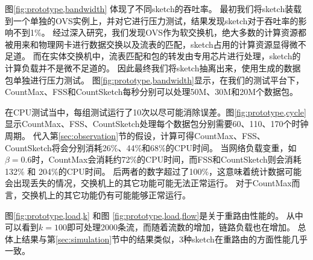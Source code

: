 图\ref{fig:prototype,bandwidth} 体现了不同sketch的吞吐率。
最初我们将sketch装载到一个单独的OVS实例上，并对它进行压力测试，结果发现sketch对于吞吐率的影响不到1\%。
经过深入研究，我们发现OVS作为软交换机，绝大多数的计算资源都被用来和物理网卡进行数据交换以及流表的匹配，sketch占用的计算资源显得微不足道。
而在实体交换机中，流表匹配和包的转发由专用芯片进行处理，sketch的计算负载并不是微不足道的。
因此最终我们将sketch抽离出来，使用生成的数据包单独进行压力测试。
图\ref{fig:prototype,bandwidth}显示，在我们的测试平台下，CountMax、FSS和CountSketch每秒分别可以处理50M、30M和20M个数据包。

在CPU测试当中，每组测试运行了10次以尽可能消除误差。图\ref{fig:prototype,cycle}显示CountMax、FSS、CountSketch处理每个数据包分别需要60、110、170个时钟周期。
代入第\ref{sec:observation}节的假设，计算可得CountMax、FSS、CountSketch将会分别消耗26\%、44\%和68\%的CPU时间。
当网络负载变重，如$\beta=0.6$时，CountMax会消耗约72\%的CPU时间，而FSS和CountSketch则会消耗132\% 和 204\%的CPU时间。
后两者的数字超过了100\%，这意味着统计数据可能会出现丢失的情况，交换机上的其它功能可能无法正常运行。
对于CountMax而言，交换机上的其它功能仍有可能能够正常运行。


图\ref{fig:prototype,load,k} 和图 \ref{fig:prototype,load,flow}是关于重路由性能的。
从中可以看到$k=100$即可处理2000条流，而随着流数的增加，链路负载也在增加。
总体上结果与第\ref{sec:simulation}节中的结果类似，3种sketch在重路由的方面性能几乎一致。
